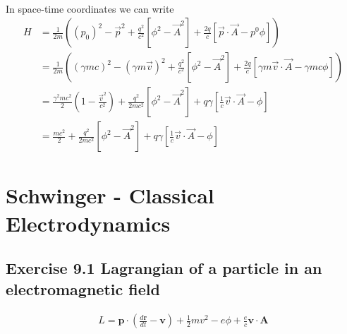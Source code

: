 \documentclass[10pt,a4paper]{book}
\theoremstyle{definition}
\begin{document}
\begin{enumerate}
\begin{align}
\end{align}
In space-time coordinates we can write
\begin{align}
H&=\frac{1}{2m}\left((p_0)^2-\vec{p}^2+\frac{q^2}{c^2}[\phi^2-\vec{A}^2]+\frac{2q}{c}[\vec{p}\cdot\vec{A}-p^0\phi]\right)\\
&=\frac{1}{2m}\left((\gamma m c)^2-(\gamma m\vec{v})^2+\frac{q^2}{c^2}[\phi^2-\vec{A}^2]+\frac{2q}{c}[\gamma m\vec{v}\cdot\vec{A}-\gamma m c\phi]\right)\\
&=\frac{\gamma^2mc^2}{2}\left(1-\frac{\vec{v}^2}{c^2}\right)+\frac{q^2}{2mc^2}[\phi^2-\vec{A}^2]+q\gamma[\frac{1}{c}\vec{v}\cdot\vec{A}- \phi]\\
&=\frac{mc^2}{2}+\frac{q^2}{2mc^2}[\phi^2-\vec{A}^2]+q\gamma[\frac{1}{c}\vec{v}\cdot\vec{A}- \phi]
\end{align}
\end{enumerate}

\section{{\sc Schwinger} - Classical Electrodynamics}
\subsection{Exercise 9.1 Lagrangian of a particle in an electromagnetic field}
\begin{align}
L=\mathbf{p}\cdot\left(\frac{d\mathbf{r}}{dt}-\mathbf{v}\right)+\frac{1}{2}mv^2-e\phi+\frac{e}{c}\mathbf{v}\cdot\mathbf{A}
\end{align}
\end{document}
